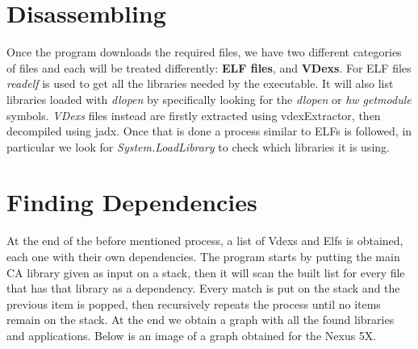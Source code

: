 \documentclass[a4paper,11pt,oneside]{report}
\begin{document}
\section{Disassembling}
Once the program downloads the required files, we have two different categories
of files and each will be treated differently: \textbf{ELF files},
and \textbf{VDexs}. For ELF files \emph{readelf} is used to get all the libraries
needed by the executable. It will also list libraries loaded with \emph{dlopen}
by specifically looking for the \emph{dlopen} or
\emph{hw \textunderscore get\textunderscore module} symbols.
\emph{VDexs} files instead are firstly extracted using vdexExtractor, then
decompiled using jadx. Once that is done a process similar to ELFs is followed,
in particular we look for \emph{System.LoadLibrary} to check which libraries
it is using.
\section{Finding Dependencies}
At the end of the before mentioned process, a list of Vdexs and Elfs is obtained, each one with
their own dependencies. The program starts by putting the main CA library given
as input on a stack, then it will scan the built list for every file that has
that library as a dependency. Every match is put on the stack and the previous
item is popped, then recursively repeats the
process until no items remain on the stack. At the end we obtain
a graph with all the found libraries and applications. Below is an image
of a graph obtained for the Nexus 5X.
\end{document}
